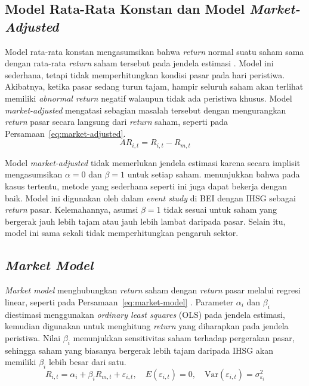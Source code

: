 \subsection{Model Rata-Rata Konstan dan Model \emph{Market-Adjusted}}

Model rata-rata konstan mengasumsikan bahwa \emph{return} normal suatu saham sama dengan rata-rata \emph{return} saham tersebut pada jendela estimasi \autocite{mackinlay1997}. Model ini sederhana, tetapi tidak memperhitungkan kondisi pasar pada hari peristiwa. Akibatnya, ketika pasar sedang turun tajam, hampir seluruh saham akan terlihat memiliki \emph{abnormal return} negatif walaupun tidak ada peristiwa khusus. Model \emph{market-adjusted} mengatasi sebagian masalah tersebut dengan mengurangkan \emph{return} pasar secara langsung dari \emph{return} saham, seperti pada Persamaan~\ref{eq:market-adjusted}.
\begin{equation}
AR_{i,t} = R_{i,t} - R_{m,t}
\label{eq:market-adjusted}
\end{equation}

Model \emph{market-adjusted} tidak memerlukan jendela estimasi karena secara implisit mengasumsikan $\alpha = 0$ dan $\beta = 1$ untuk setiap saham. \textcite{brown1985} menunjukkan bahwa pada kasus tertentu, metode yang sederhana seperti ini juga dapat bekerja dengan baik. Model ini digunakan oleh \textcite{sudirman2026} dalam \emph{event study} di BEI dengan IHSG sebagai \emph{return} pasar. Kelemahannya, asumsi $\beta = 1$ tidak sesuai untuk saham yang bergerak jauh lebih tajam atau jauh lebih lambat daripada pasar. Selain itu, model ini sama sekali tidak memperhitungkan pengaruh sektor.

\subsection{\emph{Market Model}}

\emph{Market model} menghubungkan \emph{return} saham dengan \emph{return} pasar melalui regresi linear, seperti pada Persamaan~\ref{eq:market-model} \autocite{mackinlay1997}. Parameter $\alpha_i$ dan $\beta_i$ diestimasi menggunakan \emph{ordinary least squares} (OLS) pada jendela estimasi, kemudian digunakan untuk menghitung \emph{return} yang diharapkan pada jendela peristiwa. Nilai $\beta_i$ menunjukkan sensitivitas saham terhadap pergerakan pasar, sehingga saham yang biasanya bergerak lebih tajam daripada IHSG akan memiliki $\beta_i$ lebih besar dari satu.
\begin{equation}
R_{i,t} = \alpha_i + \beta_i R_{m,t} + \varepsilon_{i,t}, \quad E(\varepsilon_{i,t}) = 0, \quad \mathrm{Var}(\varepsilon_{i,t}) = \sigma^2_{\varepsilon_i}
\label{eq:market-model}
\end{equation}

